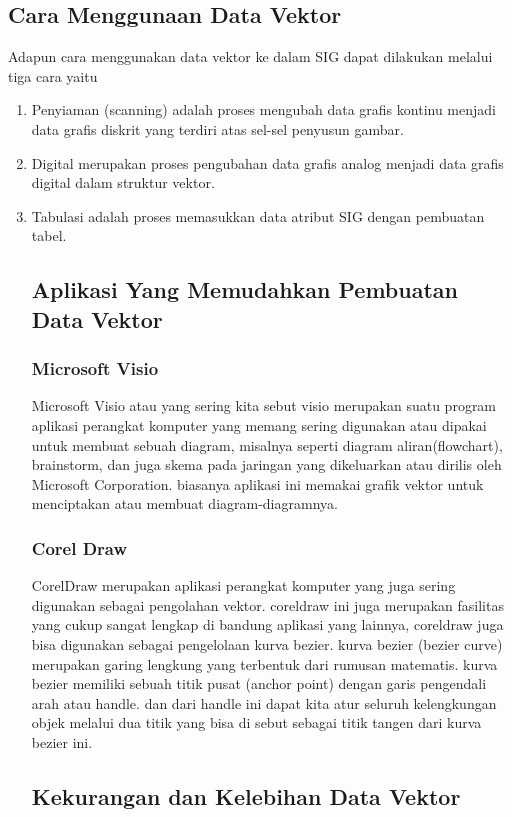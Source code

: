 \subsection { Cara Menggunaan Data Vektor}
Adapun cara menggunakan data vektor ke dalam SIG dapat dilakukan melalui tiga cara yaitu 
\begin{enumerate}
\item Penyiaman (scanning) adalah proses mengubah data grafis kontinu menjadi data grafis diskrit yang terdiri atas sel-sel penyusun gambar.
\item Digital merupakan proses pengubahan data grafis analog menjadi data grafis digital dalam struktur vektor.
\item Tabulasi adalah proses memasukkan data atribut SIG dengan pembuatan tabel.

\subsection {Aplikasi Yang Memudahkan Pembuatan Data Vektor}
\subsubsection {Microsoft Visio}
Microsoft Visio atau yang sering kita sebut visio merupakan suatu program aplikasi perangkat komputer yang memang sering digunakan atau dipakai untuk membuat sebuah diagram, misalnya seperti diagram aliran(flowchart), brainstorm, dan juga skema pada jaringan yang dikeluarkan atau dirilis oleh Microsoft Corporation. biasanya aplikasi ini memakai grafik vektor untuk menciptakan atau membuat diagram-diagramnya.
\subsubsection {Corel Draw}
CorelDraw merupakan aplikasi perangkat komputer yang juga sering digunakan sebagai pengolahan vektor. coreldraw ini juga merupakan fasilitas yang cukup sangat lengkap di bandung aplikasi yang lainnya, coreldraw juga bisa digunakan sebagai pengelolaan kurva bezier. kurva bezier (bezier curve) merupakan garing lengkung yang terbentuk dari rumusan matematis. 
kurva bezier memiliki sebuah titik pusat (anchor point) dengan garis pengendali arah atau handle. dan dari handle ini dapat kita atur seluruh kelengkungan objek melalui dua titik yang bisa di sebut sebagai titik tangen dari kurva bezier ini.

\subsection{Kekurangan dan Kelebihan Data Vektor}

\end{enumerate}
